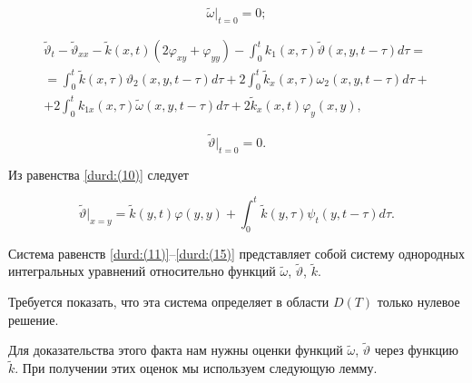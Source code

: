 \begin{equation}

\label{durd:(12)}

\widetilde{\omega}\big|_{t=0}=0;

\end{equation}

\begin{multline}

\label{durd:(13)}

\widetilde{\vartheta}_{t}-\widetilde{\vartheta}_{xx}-\tilde{k}(x,t)(2\varphi_{xy}+\varphi_{yy})-\int^{t}_{0}k_{1}(x,\tau)\widetilde{\vartheta}(x,y,t-\tau)d\tau=

\\

=\int^{t}_{0}\tilde{k}(x,\tau)\vartheta_{2}(x,y,t-\tau)d\tau+2\int^{t}_{0}\tilde{k}_{x}(x,\tau)\omega_{2}(x,y,t-\tau)d\tau+

\\

+2\int^{t}_{0}k_{1x}(x,\tau)\widetilde{\omega}(x,y,t-\tau)d\tau+2\tilde{k}_{x}(x,t)\varphi_{y}(x,y), 

\end{multline}

\begin{equation}

\label{durd:(14)}

\widetilde{\vartheta}\big|_{t=0}=0.

\end{equation}



Из равенства \eqref{durd:(10)} следует

\begin{equation}

\label{durd:(15)}

\widetilde{\vartheta}\big|_{x=y}=\tilde{k}(y,t)\varphi(y,y)+\int^{t}_{0}\tilde{k}(y,\tau)\psi_{t}(y,t-\tau)d\tau. 

\end{equation}



Система равенств \eqref{durd:(11)}--\eqref{durd:(15)} представляет собой  систему однородных интегральных  уравнений относительно функций $\widetilde{\omega}$, $\widetilde{\vartheta}$, $\tilde{k}$. 

Требуется показать, что эта система определяет в области $D(T)$ только нулевое решение. 

Для доказательства этого факта нам нужны оценки функций $\widetilde{\omega}$, $\widetilde{\vartheta}$ через функцию $\tilde{k}$. При получении этих оценок мы используем следующую лемму.



